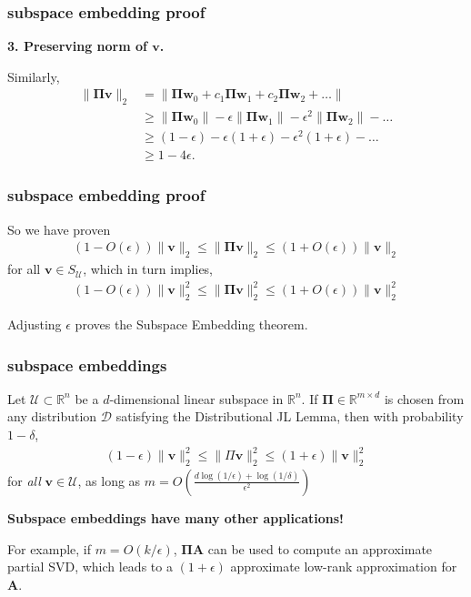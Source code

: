 \documentclass[compress]{beamer}
\newcommand{\bs}[1]{\boldsymbol{#1}}
\newcommand{\bv}[1]{\mathbf{#1}}
\newcommand{\R}{\mathbb{R}}
\begin{document}
\begin{frame}[t]
	\frametitle{subspace embedding proof}
	\begin{center}
		\alert{\textbf{3. Preserving norm of $\bv{v}$.}}
	\end{center}
	
	Similarly,
	\begin{align*}
		\|\bs{\Pi} \bv{v}\|_2 &= 	\|\bs{\Pi}\bv{w}_0 + c_1\bs{\Pi}\bv{w}_1+ c_2\bs{\Pi}\bv{w}_2 + \ldots\| \\ &\geq \|\bs{\Pi}\bv{w}_0 \| - \epsilon\|\bs{\Pi}\bv{w}_1 \| - \epsilon^2 \|\bs{\Pi}\bv{w}_2 \| - \ldots \\
		&\geq (1-\epsilon) - \epsilon(1+\epsilon)- \epsilon^2 (1+\epsilon) - \ldots \\ &\geq 1-4\epsilon.
	\end{align*}
\end{frame}

\begin{frame}
	\frametitle{subspace embedding proof}
	So we have proven
	\begin{align*}
		\left(1-O(\epsilon)\right)\|\bv{v}\|_2 \leq	\|\bs{\Pi}\bv{v} \|_2 \leq \left(1+O(\epsilon)\right)\|\bv{v}\|_2 
	\end{align*}
	for all $\bv{v} \in S_{\mathcal{U}}$, which in turn implies,
	\begin{align*}
				\left(1-O(\epsilon)\right)\|\bv{v}\|_2^2 \leq	\|\bs{\Pi}\bv{v} \|_2^2 \leq \left(1+O(\epsilon)\right)\|\bv{v}\|_2^2 
	\end{align*}
	
	Adjusting $\epsilon$ proves the Subspace Embedding theorem.
\end{frame}


\begin{frame}
	\frametitle{subspace embeddings}
	\begin{theorem}
		Let $\mathcal{U} \subset \R^n$ be a $d$-dimensional linear subspace in $\R^n$. If $\bs{\Pi}\in \R^{m\times d}$ is chosen from any distribution $\mathcal{D}$ satisfying the Distributional JL Lemma, then with probability $1-\delta$,
		\begin{align}
			(1-\epsilon) \|\bv{v}\|_2^2 \leq \|\Pi \bv{v}\|_2^2 \leq	(1+\epsilon)\|\bv{v}\|_2^2
		\end{align}
		for \emph{all} $\bv{v} \in \mathcal{U}$, as long as  $m = O\left(\frac{d\log(1/\epsilon) + \log(1/\delta)}{\epsilon^2}\right)$
	\end{theorem}
	\begin{center}
	\alert{\textbf{Subspace embeddings have many other applications!}}
\end{center}
For example, if $m = O(k/\epsilon)$, $\bs{\Pi}\bv{A}$ can be used to compute an approximate partial SVD, which leads to a $(1+\epsilon)$ approximate low-rank approximation for $\bv{A}$. 
\end{frame}
\end{document}
